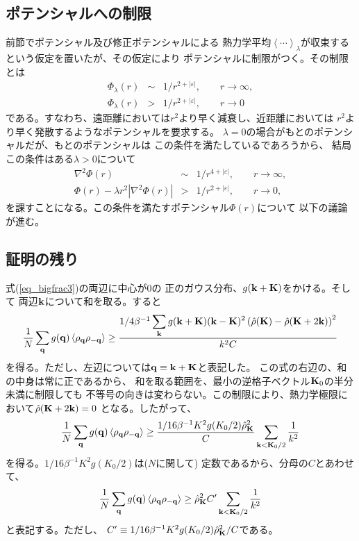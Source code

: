 \documentclass{jarticle}
\renewcommand{\v}[1]{{\bf #1}}
\newcommand{\ave}[1]{\left< #1 \right>}
\newcommand{\hr}{\hat{\rho}}
\begin{document}
\subsection{ポテンシャルへの制限}

前節でポテンシャル及び修正ポテンシャルによる
熱力学平均$\ave{\cdots}_\lambda$が収束するという仮定を置いたが、その仮定により
ポテンシャルに制限がつく\cite{Fisher}。その制限とは
\begin{eqnarray}
  \Phi_\lambda(r) &\sim& 1/r^{2+|\varepsilon|}, \qquad r \rightarrow \infty,\\
  \Phi_\lambda(r) &>& 1/r^{2+|\varepsilon|}, \qquad r \rightarrow 0
\end{eqnarray}
である。すなわち、遠距離においては$r^2$より早く減衰し、近距離においては
$r^2$より早く発散するようなポテンシャルを要求する。
$\lambda = 0$の場合がもとのポテンシャルだが、もとのポテンシャルは
この条件を満たしているであろうから、
結局この条件はある$\lambda>0$について
\begin{eqnarray}
  \nabla^2 \Phi(r) &\sim& 1/r^{4+|\varepsilon|}, \qquad r \rightarrow \infty,\\
  \Phi(r) - \lambda r^2  |\nabla^2 \Phi(r)| &>& 1/r^{2+|\varepsilon|}, \qquad r \rightarrow 0,
\end{eqnarray}
を課すことになる。この条件を満たすポテンシャル$\Phi(r)$について
以下の議論が進む。

\subsection{証明の残り}

式(\ref{eq_bigfrac3})の両辺に中心が$0$の
正のガウス分布、$g(\v{k}+\v{K})$をかける。そして
両辺$\v{k}$について和を取る。すると
\begin{equation}
  \frac{1}{N}
  \sum_{\v{q}} g(\v{q}) \ave{\rho_{\v{q}}\rho_{-\v{q}}}
  \ge
  \frac{
    1/4 \beta^{-1} \displaystyle\sum_{\v{k}} g(\v{k}+\v{K})(\v{k} - \v{K})^2
    \left( \hr(\v{K})-\hr(\v{K}+2\v{k}) \right)^2
  }{
    k^2  C
  }
\end{equation}
を得る。ただし、左辺については$\v{q} \equiv \v{k} +\v{K}$と表記した。
この式の右辺の、和の中身は常に正であるから、
和を取る範囲を、最小の逆格子ベクトル$\v{K}_0$の半分未満に制限しても
不等号の向きは変わらない。この制限により、熱力学極限において$\hr(\v{K}+2\v{k})=0$
となる。したがって、
\begin{equation}
  \frac{1}{N}
  \sum_{\v{q}} g(\v{q}) \ave{\rho_{\v{q}}\rho_{-\v{q}}}
  \ge
  \frac{
    1/16 \beta^{-1} K^2 g(K_0/2)\hr_{\v{K}}^2
  }{
    C
  } \sum_{\v{k}<\v{K}_0/2} \frac{1}{k^2}
  \label{eq_gauss}
\end{equation}
を得る。$1/16 \beta^{-1} K^2 g(K_0/2)$は($N$に関して)
定数であるから、分母の$C$とあわせて、
\begin{equation}
  \frac{1}{N}
  \sum_{\v{q}} g(\v{q}) \ave{\rho_{\v{q}}\rho_{-\v{q}}}
  \ge
  \hr_{\v{K}}^2 C' \sum_{\v{k}<\v{K}_0/2} \frac{1}{k^2}
\end{equation}
と表記する。ただし、
$C' \equiv 1/16 \beta^{-1} K^2 g(K_0/2)\hr_{\v{K}}^2/C$である。
\end{document}
